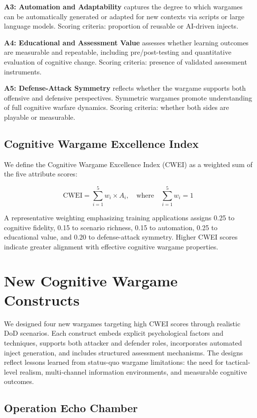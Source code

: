\documentclass[12pt]{article}
\begin{document}
\textbf{A3: Automation and Adaptability} captures the degree to which wargames can be automatically generated or adapted for new contexts via scripts or large language models. Scoring criteria: proportion of reusable or AI-driven injects.

\textbf{A4: Educational and Assessment Value} assesses whether learning outcomes are measurable and repeatable, including pre/post-testing and quantitative evaluation of cognitive change. Scoring criteria: presence of validated assessment instruments.

\textbf{A5: Defense-Attack Symmetry} reflects whether the wargame supports both offensive and defensive perspectives. Symmetric wargames promote understanding of full cognitive warfare dynamics. Scoring criteria: whether both sides are playable or measurable.

\subsection{Cognitive Wargame Excellence Index}

We define the Cognitive Wargame Excellence Index (CWEI) as a weighted sum of the five attribute scores:

\[
\text{CWEI} = \sum_{i=1}^{5} w_i \times A_i, \quad \text{where} \quad \sum_{i=1}^{5} w_i = 1
\]

A representative weighting emphasizing training applications assigns 0.25 to cognitive fidelity, 0.15 to scenario richness, 0.15 to automation, 0.25 to educational value, and 0.20 to defense-attack symmetry. Higher CWEI scores indicate greater alignment with effective cognitive wargame properties.

\section{New Cognitive Wargame Constructs}

We designed four new wargames targeting high CWEI scores through realistic DoD scenarios. Each construct embeds explicit psychological factors and techniques, supports both attacker and defender roles, incorporates automated inject generation, and includes structured assessment mechanisms. The designs reflect lessons learned from status-quo wargame limitations: the need for tactical-level realism, multi-channel information environments, and measurable cognitive outcomes.

\subsection{Operation Echo Chamber}
\end{document}
